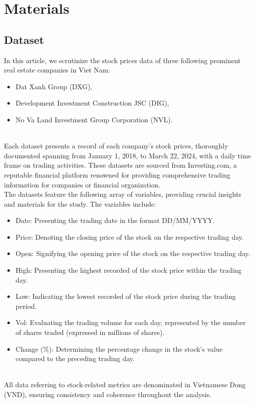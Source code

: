 \documentclass{ieeeojies}
\begin{document}
\section{Materials}
\subsection{Dataset}

In this article, we scrutinize the stock prices data of three following prominent real estate companies in Viet Nam:
\begin{itemize}
    \item Dat Xanh Group (DXG), 
    \item Development Investment Construction JSC (DIG),
    \item No Va Land Investment Group Corporation (NVL).
\end{itemize} \\
Each dataset presents a record of each company's stock prices, thoroughly documented spanning from January 1, 2018, to March 22, 2024, with a daily time frame on trading activities. These datasets are sourced from Investing.com, a reputable financial platform renowned for providing comprehensive trading information for companies or financial organization.\\
The datasets feature the following array of variables, providing crucial insights and materials for the study. The variables include:
\begin{itemize}
    \item Date: Presenting the trading date in the format DD/MM/YYYY.
    \item Price: Denoting the closing price of the stock on the respective trading day.
    \item Open: Signifying the opening price of the stock on the respective trading day.
    \item High: Presenting the highest recorded of the stock price within the trading day.
    \item Low: Indicating the lowest recorded of the stock price during the trading period.
    \item Vol: Evaluating the trading volume for each day, represented by the number of shares traded (expressed in millions of shares).
    \item Change (\%): Determining the percentage change in the stock's value compared to the preceding trading day.
\end{itemize} \\
All data referring to stock-related metrics are denominated in Vietnamese Dong (VND), ensuring consistency and coherence throughout the analysis.
\end{document}
